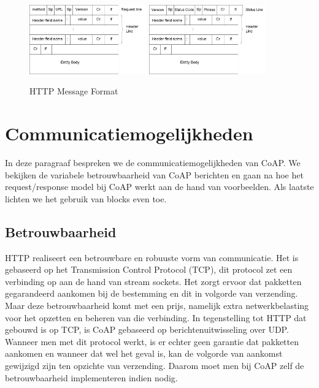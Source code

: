 \begin{figure}[h]
\vspace{10pt}
\centering
{}
{\includegraphics[width=0.45\textwidth]{fig/HTTPRequestMessageFormat}}
{\includegraphics[width=0.45\textwidth]{fig/HTTPResponseMessageFormat}}
\caption{HTTP Message Format}\label{fig:HTTPMessageFormat}
\end{figure}

\newpage

\section{Communicatiemogelijkheden} \label{communicatieMogelijkheden}

In deze paragraaf bespreken we de communicatiemogelijkheden van CoAP. We bekijken de variabele betrouwbaarheid van CoAP berichten en gaan na hoe het request/response model bij CoAP werkt aan de hand van voorbeelden. Als laatste lichten we het gebruik van blocks even toe.

\subsection{Betrouwbaarheid}

HTTP realiseert een betrouwbare en robuuste vorm van communicatie. Het is gebaseerd op het Transmission Control Protocol (TCP), dit protocol zet een verbinding op aan de hand van stream sockets. Het zorgt ervoor dat pakketten gegarandeerd aankomen bij de bestemming en dit in volgorde van verzending. Maar deze betrouwbaarheid komt met een prijs, namelijk extra netwerkbelasting voor het opzetten en beheren van die verbinding. In tegenstelling tot HTTP dat gebouwd is op TCP, is CoAP gebaseerd op berichtenuitwisseling over UDP. Wanneer men met dit protocol werkt, is er echter geen garantie dat pakketten aankomen en wanneer dat wel het geval is, kan de volgorde van aankomst gewijzigd zijn ten opzichte van verzending. Daarom moet men bij CoAP zelf de betrouwbaarheid implementeren indien nodig.

